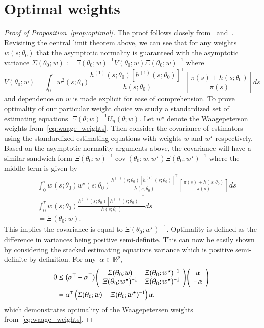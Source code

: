 \documentclass[12pt]{amsart}
\def\cov{\mathop{\text{cov}}\nolimits}
\begin{document}

\section{Optimal weights}
\label{app:optimalweights}

\begin{proof}[Proof of Proposition~\ref{prop:optimal}]
The proof follows closely from~\cite{Rathbun2012} and~\cite{Ferreira82}.  Revisiting the central limit theorem above, we can see that for any weights~$w(s; \theta_0)$ that the asymptotic normality is guaranteed with the asymptotic variance $\Sigma(\theta_0; w) := \Xi(\theta_0; w)^{-1} V(\theta_0; w) \Xi(\theta_0; w)^{-1}$ where
$$
V(\theta_0; w) = \int_0^\tau w^2 (s; \theta_0) \frac{h^{(1)}(s; \theta_0) [h^{(1)} (s;\theta_0)]^\top}{h (s;\theta_0)} \left[ \frac{\pi (s) + h(s;\theta_0)}{\pi (s)} \right] ds
$$
and dependence on $w$ is made explicit for ease of comprehension.
To prove optimality of our particular weight choice we study a standardized set of estimating equations~$\Xi (\theta; w)^{-1} U_n (\theta; w)$.  Let $w^\star$ denote the Waagepeterson weights from~\eqref{eq:waage_weights}.  Then consider the covariance of estimators using the standardized estimating equations with weights $w$ and $w^\star$ respectively. Based on the asymptotic normality arguments above, the covariance will have a similar sandwich form $\Xi (\theta_0; w)^{-1} \cov (\theta_0; w,w^\star) \Xi(\theta_0; w^\star)^{-1}$ where the middle term is given by
\begin{align*}
&\int_0^\tau w(s;\theta_0) w^\star (s; \theta_0) \frac{h^{(1)}(s; \theta_0) [h^{(1)} (s;\theta_0)]^\top}{h (s;\theta_0)} \left[ \frac{\pi (s) + h(s;\theta_0)}{\pi (s)} \right] ds \\
=&\int_0^\tau w(s;\theta_0) \frac{h^{(1)}(s; \theta_0) [h^{(1)} (s;\theta_0)]^\top}{h (s;\theta_0)} ds \\
&= \Xi (\theta_0; w).
\end{align*}
This implies the covariance is equal to $\Xi(\theta_0; w^\star)^{-1}$.  Optimality is defined as the difference in variances being positive semi-definite.  This can now be easily shown by considering the stacked estimating equations variance which is positive semi-definite by definition.  For any~$\alpha \in \mathbb{R}^{p}$,
\begin{align*}
0 &\leq \left( \alpha^\top - \alpha^\top \right)
\left( \begin{array}{c c} \Sigma(\theta_0; w) & \Xi (\theta_0; w^\star)^{-1} \\ \Xi(\theta_0; w^\star)^{-1} & \Xi (\theta_0; w^\star)^{-1} \end{array} \right)
\left( \begin{array}{c} \alpha \\ - \alpha \end{array} \right)\\
&= \alpha^\top \left( \Sigma(\theta_0; w) - \Xi (\theta_0; w^\star)^{-1} \right) \alpha.
\end{align*}
which demonstrates optimality of the Waagepetersen weights from~\eqref{eq:waage_weights}.


\end{proof}
\end{document}
